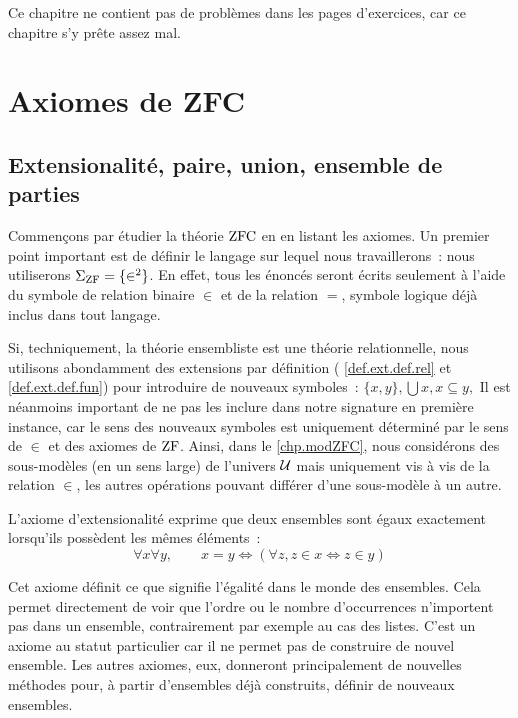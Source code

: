 Ce chapitre ne contient pas de problèmes dans les pages d'exercices, car ce
chapitre s'y prête assez mal.

\section{Axiomes de ZFC}

\subsection[Premiers axiomes]{Extensionalité, paire, union, ensemble de parties}

Commençons par étudier la théorie $\operatorname{ZFC}$ en en listant les axiomes. Un premier
point important est de définir le langage sur lequel nous travaillerons~: nous
utiliserons $\Sigma_{\operatorname{ZF}} = \{ \in^2\}$. En effet, tous les énoncés seront écrits
seulement à l'aide du symbole de relation binaire $\in$ et de la relation $=$,
symbole logique déjà inclus dans tout langage.

\begin{remark}
  Si, techniquement, la théorie ensembliste est une théorie relationnelle, nous
  utilisons abondamment des extensions par définition
  ( \cref{def.ext.def.rel} et
  \cref{def.ext.def.fun}) pour introduire de nouveaux symboles~:
  $\{x,y\}, \bigcup x, x \subseteq y,$ 
  Il est néanmoins important de ne pas
  les inclure dans notre signature en première instance, car le sens des
  nouveaux symboles est uniquement déterminé par le sens de $\in$ et des axiomes
  de $\operatorname{ZF}$. Ainsi, dans le \cref{chp.modZFC}, nous considérons des
  sous-modèles (en un sens large) de l'univers $\mathcal{U}$ mais uniquement vis
  à vis de la relation $\in$, les autres opérations pouvant différer d'une
  sous-modèle à un autre.
\end{remark}

\begin{axiom}[Extensionalité]\label{ax.ZF.ext}
  L'axiome d'extensionalité exprime que deux ensembles sont égaux exactement
  lorsqu'ils possèdent les mêmes éléments~:
  \[\forall x \forall y, \qquad x = y \iff (\forall z, z \in x\iff z \in y)\]
\end{axiom}

Cet axiome définit ce que signifie l'égalité dans le monde des ensembles. Cela
permet directement de voir que l'ordre ou le nombre d'occurrences n'importent
pas dans un ensemble, contrairement par exemple au cas des listes. C'est un
axiome au statut particulier car il ne permet pas de construire de nouvel
ensemble. Les autres axiomes, eux, donneront principalement de nouvelles
méthodes pour, à partir d'ensembles déjà construits, définir de nouveaux
ensembles.


